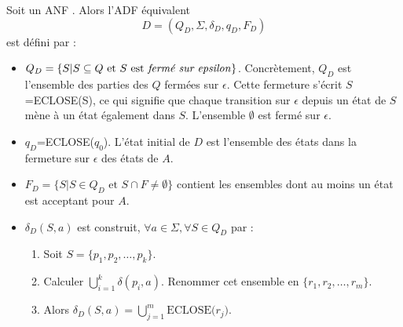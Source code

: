 Soit un ANF \automaton. Alors l'ADF équivalent
$$
D=(Q_D, \Sigma, \delta_D, q_D, F_D)
$$
est défini par :
\begin{itemize}
	\item $Q_D = \{S | S \subseteq Q \text{ et } S \text{ est \emph{fermé sur epsilon}}\}$. Concrètement, $Q_D$ est l'ensemble des parties des $Q$ fermées sur $\epsilon$. Cette fermeture s'écrit $S$=ECLOSE(S), ce qui signifie que chaque transition sur $\epsilon$ depuis un état de $S$ mène à un état également dans $S$. L'ensemble $\emptyset$ est fermé sur $\epsilon$.
	\item $q_D$=ECLOSE($q_0$). L'état initial de $D$ est l'ensemble des états dans la fermeture sur $\epsilon$ des états de $A$.
	\item $F_D= \{S|S \in Q_D \text{ et } S \cap F \neq \emptyset\}$ contient les ensembles dont au moins un état est acceptant pour $A$.
	\item $\delta_D(S,a)$ est construit, $\forall a \in \Sigma, \forall S \in Q_D$ par :
		\begin{enumerate}
			\item Soit $S=\{p_1, p_2,\dots,p_k\}$.
			\item Calculer $\bigcup_{i=1}^k\delta(p_i,a)$. Renommer cet ensemble en $\{r_1, r_2, \dots, r_m\}$.
			\item Alors $\delta_D(S,a)=\bigcup_{j=1}^m\text{ECLOSE(}r_j\text{)}$.
		\end{enumerate}
\end{itemize}


